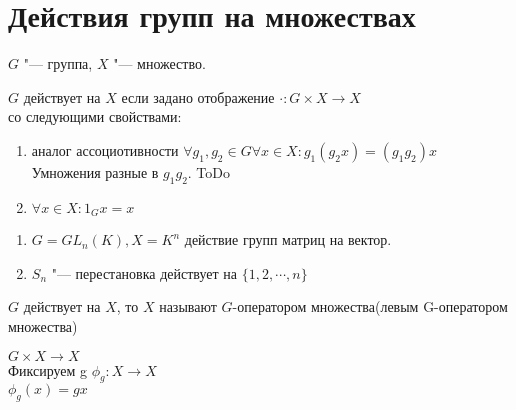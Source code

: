 ﻿\section{Действия групп на множествах}
$G$ "--- группа, $X$ "--- множество.
\begin{Def}
$G$ действует на $X$ если задано отображение $\cdot \colon G \times X \to X$\\
со следующими свойствами:
  \begin{enumerate}
  \item аналог ассоциотивности $\forall g_1, g_2 \in G \forall x \in X \colon g_1(g_2x) = (g_1g_2)x$\\
  Умножения разные в $g_1g_2$. ToDo
  \item $\forall x \in X \colon 1_G x = x$
  \end{enumerate}
\end{Def} 
\begin{exmp}\hfill
\begin{enumerate}
\item $G = GL_n(K), X = K^{n}$ 
действие групп матриц на вектор.
\item 
$S_n$ "--- перестановка действует на $\{1, 2, \cdots, n\}$
\end{enumerate}
\end{exmp}
\begin{Def}
$G$ действует на $X$, то $X$ называют $G$-оператором множества(левым G-оператором множества)\\
\end{Def}
$G \times X \to X$\\
Фиксируем g
$\phi_{g}\colon X \to X$\\
$\phi_{g}(x) = gx$\\

